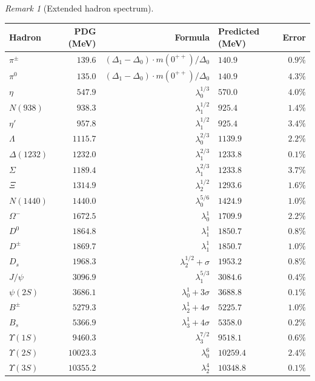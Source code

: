 \documentclass[11pt,a4paper]{article}
\let\hline\midrule
\theoremstyle{definition}
\theoremstyle{remark}
\newtheorem{remark}[theorem]{Remark}
\begin{document}
\begin{remark}[Extended hadron spectrum]
\begin{center}
\renewcommand{\arraystretch}{1.12}
\begin{tabular}{lrrlr}
\hline
Hadron & PDG (MeV) & Formula & Predicted (MeV) & Error \\
\hline
$\pi^\pm$ & $139.6$ & $(\Delta_1-\Delta_0)\cdot m(0^{++})/\Delta_0$ & $140.9$ & $0.9\%$ \\
$\pi^0$ & $135.0$ & $(\Delta_1-\Delta_0)\cdot m(0^{++})/\Delta_0$ & $140.9$ & $4.3\%$ \\
$\eta$ & $547.9$ & $\lambda_0^{1/3}$ & $570.0$ & $4.0\%$ \\
$N(938)$ & $938.3$ & $\lambda_1^{1/2}$ & $925.4$ & $1.4\%$ \\
$\eta'$ & $957.8$ & $\lambda_1^{1/2}$ & $925.4$ & $3.4\%$ \\
$\Lambda$ & $1115.7$ & $\lambda_0^{2/3}$ & $1139.9$ & $2.2\%$ \\
$\Delta(1232)$ & $1232.0$ & $\lambda_1^{2/3}$ & $1233.8$ & $0.1\%$ \\
$\Sigma$ & $1189.4$ & $\lambda_1^{2/3}$ & $1233.8$ & $3.7\%$ \\
$\Xi$ & $1314.9$ & $\lambda_2^{1/2}$ & $1293.6$ & $1.6\%$ \\
$N(1440)$ & $1440.0$ & $\lambda_0^{5/6}$ & $1424.9$ & $1.0\%$ \\
$\Omega^-$ & $1672.5$ & $\lambda_0^1$ & $1709.9$ & $2.2\%$ \\
$D^0$ & $1864.8$ & $\lambda_1^1$ & $1850.7$ & $0.8\%$ \\
$D^\pm$ & $1869.7$ & $\lambda_1^1$ & $1850.7$ & $1.0\%$ \\
$D_s$ & $1968.3$ & $\lambda_2^{1/2}+\sigma$ & $1953.2$ & $0.8\%$ \\
$J/\psi$ & $3096.9$ & $\lambda_1^{5/3}$ & $3084.6$ & $0.4\%$ \\
$\psi(2S)$ & $3686.1$ & $\lambda_0^1+3\sigma$ & $3688.8$ & $0.1\%$ \\
$B^\pm$ & $5279.3$ & $\lambda_2^1+4\sigma$ & $5225.7$ & $1.0\%$ \\
$B_s$ & $5366.9$ & $\lambda_3^1+4\sigma$ & $5358.0$ & $0.2\%$ \\
$\Upsilon(1S)$ & $9460.3$ & $\lambda_3^{7/2}$ & $9518.1$ & $0.6\%$ \\
$\Upsilon(2S)$ & $10023.3$ & $\lambda_0^6$ & $10259.4$ & $2.4\%$ \\
$\Upsilon(3S)$ & $10355.2$ & $\lambda_2^4$ & $10348.8$ & $0.1\%$ \\
\hline
\end{tabular}
\end{center}


\end{remark}
\end{document}
